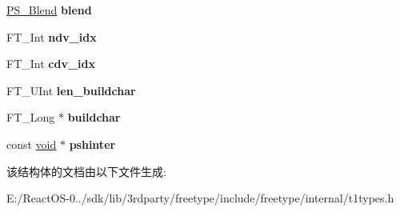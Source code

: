 \begin{DoxyCompactItemize}
\hyperlink{struct_p_s___blend_rec__}{P\+S\+\_\+\+Blend} {\bfseries blend}
\item 
\mbox{\label{struct_t1___face_rec___a0ecadea7618642ccc351f81ac56ec266}} 
F\+T\+\_\+\+Int {\bfseries ndv\+\_\+idx}
\item 
\mbox{\label{struct_t1___face_rec___a7a77dcddf65ac6d86f1f62b3859d11d8}} 
F\+T\+\_\+\+Int {\bfseries cdv\+\_\+idx}
\item 
\mbox{\label{struct_t1___face_rec___a75554021d0baddb1c64f69fd8dbde86b}} 
F\+T\+\_\+\+U\+Int {\bfseries len\+\_\+buildchar}
\item 
\mbox{\label{struct_t1___face_rec___af1fd890acaa0f423f7cc36807c42d75f}} 
F\+T\+\_\+\+Long $\ast$ {\bfseries buildchar}
\item 
\mbox{\label{struct_t1___face_rec___a438e8ce8cbd53b7e205b17f95e7b2106}} 
const \hyperlink{interfacevoid}{void} $\ast$ {\bfseries pshinter}
\end{DoxyCompactItemize}


该结构体的文档由以下文件生成\+:\begin{DoxyCompactItemize}
\item 
E\+:/\+React\+O\+S-\/0../sdk/lib/3rdparty/freetype/include/freetype/internal/t1types.\+h\end{DoxyCompactItemize}
